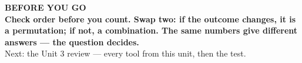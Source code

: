 \documentclass[aspectratio=169, 11pt]{beamer}
\begin{document}
{
\begin{frame}[plain]
  \vspace{1.5cm}\hspace{0.8cm}%
  \begin{minipage}{0.86\textwidth}
    {\color{goldacc}\bfseries\small BEFORE YOU GO}\\[0.7cm]
    {\color{white}\bfseries\Large Check order before you count. Swap two: if the outcome changes,
    it is a permutation; if not, a combination. The same numbers give different answers ---
    the question decides.}\\[0.9cm]
    {\color{frostmid}\small Next: the Unit 3 review --- every tool from this unit, then the
    test.}
  \end{minipage}
\end{frame}
}
\end{document}
